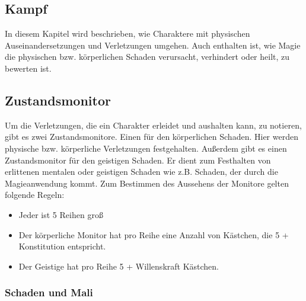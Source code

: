 \documentclass{article}
\begin{document}
\begin{center}
\section{Kampf}
\end{center}

In diesem Kapitel wird beschrieben, wie Charaktere mit physischen Auseinandersetzungen und Verletzungen umgehen. Auch
enthalten ist, wie Magie die physischen bzw. körperlichen Schaden verursacht, verhindert oder heilt, zu bewerten ist.

\begin{center}
\subsection{Zustandsmonitor}
\end{center}

Um die Verletzungen, die ein Charakter erleidet und aushalten kann, zu notieren, gibt es zwei Zustandsmonitore. Einen
für den körperlichen Schaden. Hier werden physische bzw. körperliche Verletzungen festgehalten. Außerdem gibt es einen
Zustandsmonitor für den geistigen Schaden. Er dient zum Festhalten von erlittenen mentalen oder geistigen Schaden wie
z.B. Schaden, der durch die Magieanwendung kommt. Zum Bestimmen des Aussehens der Monitore gelten folgende Regeln:

\begin{itemize}
\item Jeder ist 5 Reihen groß
\item Der körperliche Monitor hat pro Reihe eine Anzahl von Kästchen, die 5 + Konstitution entspricht.
\item Der Geistige hat pro Reihe 5 + Willenskraft Kästchen.
\end{itemize}

\subsubsection{Schaden und Mali}
\end{document}
